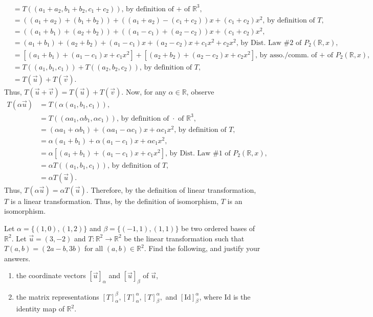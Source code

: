 \documentclass[12pt,answers]{exam}
\newcommand{\R}{\mathbb{R}}
\newenvironment{problem}[2][Problem]{\begin{trivlist}
\item[\hskip \labelsep {\bfseries #1}\hskip \labelsep {\bfseries #2.}]}{\end{trivlist}}
\begin{document}
\begin{solution}
\begin{footnotesize}
\begin{align*}
    &=T((a_{1}+a_{2},b_{1}+b_{2},c_{1}+c_{2})) \text{, by definition of + of $\R^{3}$,} \\
    &=((a_{1}+a_{2})+(b_{1}+b_{2}))+((a_{1}+a_{2})-(c_{1}+c_{2}))x+(c_{1}+c_{2})x^{2} \text{, by definition of $T$,} \\
    &=((a_{1}+b_{1})+(a_{2}+b_{2}))+((a_{1}-c_{1})+(a_{2}-c_{2}))x+(c_{1}+c_{2})x^{2},\\
    &=(a_{1}+b_{1})+(a_{2}+b_{2})+(a_{1}-c_{1})x+(a_{2}-c_{2})x+c_{1}x^2+c_{2}x^2 \text{, by Dist. Law \#2 of $P_{2}(\R,x)$,} \\
    &=[(a_{1}+b_{1})+(a_{1}-c_{1})x+c_{1}x^2]+[(a_{2}+b_{2})+(a_{2}-c_{2})x+c_{2}x^2] \text {, by asso./comm. of + of $P_{2}(\R,x)$,} \\
    &=T((a_{1},b_{1},c_{1}))+T((a_{2},b_{2},c_{2})) \text{, by definition of $T$,} \\
    &=T(\vec{u})+T(\vec{v}).
\end{align*}
Thus, $T(\vec{u}+\vec{v})=T(\vec{u})+T(\vec{v})$. Now, for any $\alpha \in \R$, observe
\begin{align*}
    T(\alpha \vec{u})&=T(\alpha (a_{1},b_{1},c_{1})), \\
    &=T((\alpha a_{1},\alpha b_{1},\alpha c_{1})) \text{, by definition of $\cdot$ of $\R^{3}$,} \\
    &=(\alpha a_{1}+\alpha b_{1})+(\alpha a_{1}-\alpha c_{1})x+\alpha c_{1}x^{2} \text{, by definition of $T$,} \\
    &=\alpha (a_{1}+b_{1})+\alpha (a_{1}-c_{1})x+\alpha c_{1}x^{2}, \\
    &=\alpha [(a_{1}+b_{1})+(a_{1}-c_{1})x+c_{1}x^{2}] \text{, by Dist. Law \#1 of $P_{2}(\R,x)$,} \\
    &=\alpha T((a_{1},b_{1},c_{1})) \text{, by definition of $T$,} \\
    &=\alpha T(\vec{u}). 
\end{align*}
Thus, $T(\alpha \vec{u})=\alpha T(\vec{u})$. Therefore, by the definition of linear transformation, $T$ is a linear transformation. Thus, by the definition of isomorphism, $T$ is an isomorphism. 
\end{footnotesize}
\end{solution}

\begin{problem}{3}
Let $\alpha=\{(1,0),(1,2)\}$ and $\beta=\{(-1,1),(1,1)\}$ be two ordered bases of $\R^{2}$. Let $\vec{u}=(3,-2)$ and $T:\R^{2}\rightarrow \R^{2}$ be the linear transformation such that $T(a,b)=(2a-b,3b)$ for all $(a,b)\in \R^{2}$. Find the following, and justify your answers.
\begin{enumerate}[label=(\alph*)]
\item the coordinate vectors $[\vec{u}]_{\alpha}$ and $[\vec{u}]_{\beta}$ of $\vec{u}$,
\item the matrix representations $[T]^{\beta}_{\alpha},[T]^{\alpha}_{\alpha},[T]^{\alpha}_{\beta},$ and $[\text{Id}]^{\alpha}_{\beta}$, where Id is the identity map of $\R^{2}$.
\end{enumerate}
\end{problem}
\end{document}
